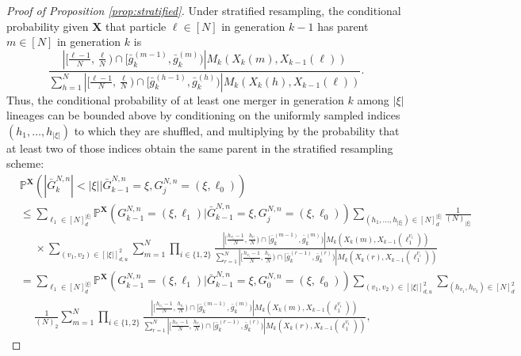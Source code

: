 \documentclass[a4paper,11pt]{article}
\theoremstyle{definition}
\newcommand{\bbP}{\mathbb{P}}
\newcommand{\bfX}{\mathbf{X}}
\begin{document}
\begin{proof}[Proof of Proposition \ref{prop:stratified}]
Under stratified resampling, the conditional probability given $\bfX$ that particle $\ell \in [N]$ in generation $k - 1$ has parent $m \in [N]$ in generation $k$ is
\begin{equation*}
\frac{ | [ \frac{ \ell - 1 }{ N }, \frac{ \ell }{ N } ) \cap [ \bar{ g }_k^{ ( m - 1 ) }, \bar{ g }_k^{ ( m ) } ) | M_k( X_k( m ), X_{ k - 1 }( \ell ) ) }{ \sum_{ h = 1 }^N | [ \frac{ \ell - 1 }{ N }, \frac{ \ell }{ N } ) \cap [ \bar{ g }_k^{ ( h - 1 ) }, \bar{ g }_k^{ ( h ) } ) | M_k( X_k( h ), X_{ k - 1 }( \ell ) ) }.
\end{equation*}
Thus, the conditional probability of at least one merger in generation $k$ among $| \xi |$ lineages can be bounded above by conditioning on the uniformly sampled indices $( h_1, \ldots, h_{ | \xi | } )$ to which they are shuffled, and multiplying by the probability that at least two of those indices obtain the same parent in the stratified resampling scheme:
\begin{align*}
&\bbP^{ \bfX }( | \bar{ G }_k^{ N, n } | < | \xi | | \bar{ G }_{ k - 1 }^{ N, n } = \xi, G_j^{ N, n } = ( \xi, \ell_0 ) ) \\
&\leq \sum_{ \ell_1 \in [ N ]_d^{ | \xi | } } \bbP^{ \bfX }( G_{ k - 1 }^{ N, n } = ( \xi, \ell_1 ) | \bar{ G }_{ k - 1 }^{ N, n } = \xi, G_j^{ N, n } = ( \xi, \ell_0 ) ) \sum_{ ( h_1, \ldots, h_{ | \xi | } ) \in [ N ]_d^{ | \xi | } }  \frac{ 1 }{ ( N )_{ | \xi | } } \\
&\phantom{=} \times \sum_{ ( v_1, v_2 ) \in [ | \xi | ]_{ d, u }^2 } \sum_{ m = 1 }^N \prod_{ i \in \{ 1, 2 \} } \frac{ | [ \frac{ h_{ v_i } - 1 }{ N }, \frac{ h_{ v_i } }{ N } ) \cap [ \bar{ g }_k^{ ( m - 1 ) }, \bar{ g }_k^{ ( m ) } ) | M_k( X_k( m ), X_{ k - 1 }( \ell_1^{ v_i } ) ) }{ \sum_{ r = 1 }^N | [ \frac{ h_{ v_i } - 1 }{ N }, \frac{ h_{ v_i } }{ N } ) \cap [ \bar{ g }_k^{ ( r - 1 ) }, \bar{ g }_k^{ ( r ) } ) | M_k( X_k( r ), X_{ k - 1 }( \ell_1^{ v_i } ) ) } \\
&= \sum_{ \ell_1 \in [ N ]_d^{ | \xi | } } \bbP^{ \bfX }( G_{ k - 1 }^{ N, n } = ( \xi, \ell_1 ) | \bar{ G }_{ k - 1 }^{ N, n } = \xi, G_0^{ N, n } = ( \xi, \ell_0 ) ) \sum_{ ( v_1, v_2 ) \in [ | \xi | ]_{ d, u }^2 } \sum_{ ( h_{ v_1 }, h_{ v_2 } ) \in [ N ]_d^2 } \\
&\phantom{=} \frac{ 1 }{ ( N )_2 } \sum_{ m = 1 }^N \prod_{ i \in \{ 1, 2 \} } \frac{ | [ \frac{ h_{ v_i } - 1 }{ N }, \frac{ h_{ v_i } }{ N } ) \cap [ \bar{ g }_k^{ ( m - 1 ) }, \bar{ g }_k^{ ( m ) } ) | M_k( X_k( m ), X_{ k - 1 }( \ell_1^{ v_i } ) ) }{ \sum_{ r = 1 }^N | [ \frac{ h_{ v_i } - 1 }{ N }, \frac{ h_{ v_i } }{ N } ) \cap [ \bar{ g }_k^{ ( r - 1 ) }, \bar{ g }_k^{ ( r ) } ) | M_k( X_k( r ), X_{ k - 1 }( \ell_1^{ v_i } ) ) },

\end{align*}
\end{proof}
\end{document}
